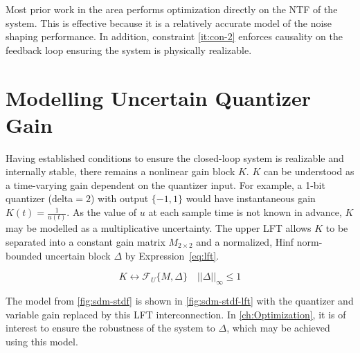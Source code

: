 Most prior work in the area performs optimization directly on the \gls{NTF} of the system. This is effective because it is a relatively accurate model of the noise shaping performance. In addition, constraint \ref{it:con-2} enforces causality on the feedback loop ensuring the system is physically realizable.

\section{Modelling Uncertain Quantizer Gain}
\label{sec:model-lft}

Having established conditions to ensure the closed-loop system is realizable and internally stable, there remains a nonlinear gain block $K$. $K$ can be understood as a time-varying gain dependent on the quantizer input. For example, a 1-bit quantizer (\gls{delta}$ = 2$) with output $\{-1, 1\}$ would have instantaneous gain $K(t) = \frac{1}{u(t)}$. As the value of $u$ at each sample time is not known in advance, $K$ may be modelled as a multiplicative uncertainty. The upper \gls{LFT} allows $K$ to be separated into a constant gain matrix $M_{2 \times 2}$ and a normalized, \gls{Hinf} norm-bounded uncertain block $\Delta$ by Expression~\ref{eq:lft}.

\begin{equation}
	K \leftrightarrow \mathcal{F}_U\{M, \Delta\} \quad ||\Delta||_\infty \leq 1 \label{eq:lft}
\end{equation}

The model from \autoref{fig:sdm-stdf} is shown in \autoref{fig:sdm-stdf-lft} with the quantizer and variable gain replaced by this \gls{LFT} interconnection. In \autoref{ch:Optimization}, it is of interest to ensure the robustness of the system to $\Delta$, which may be achieved using this model.

